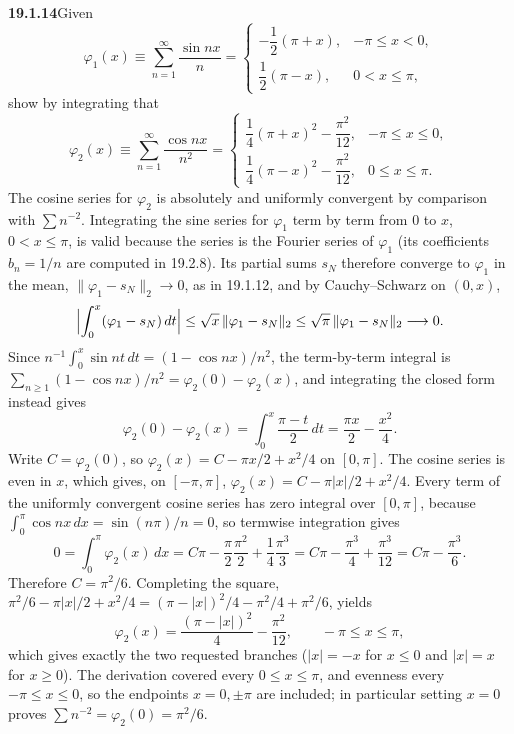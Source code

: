 \par\bigskip
\noindent\textbf{19.1.14}\quad Given
\[
\varphi_{1}(x)\equiv\sum_{n=1}^{\infty}\frac{\sin nx}{n}
=\begin{cases}
-\dfrac{1}{2}(\pi+x), & -\pi\le x<0,\\[10pt]
\dfrac{1}{2}(\pi-x), & 0<x\le\pi,
\end{cases}
\]
show by integrating that
\[
\varphi_{2}(x)\equiv\sum_{n=1}^{\infty}\frac{\cos nx}{n^{2}}
=\begin{cases}
\dfrac{1}{4}(\pi+x)^{2}-\dfrac{\pi^{2}}{12}, & -\pi\le x\le0,\\[12pt]
\dfrac{1}{4}(\pi-x)^{2}-\dfrac{\pi^{2}}{12}, & 0\le x\le\pi.
\end{cases}
\]
\solution
The cosine series for $\varphi_2$ is absolutely and uniformly convergent
by comparison with $\sum n^{-2}$.
Integrating the sine series for $\varphi_1$ term by term from $0$ to $x$,
$0<x\le\pi$, is valid because the series is the Fourier series of
$\varphi_1$ (its coefficients $b_n=1/n$ are computed in 19.2.8). Its
partial sums $s_N$ therefore converge to $\varphi_1$ in the mean,
$\|\varphi_1-s_N\|_2\to0$, as in 19.1.12, and by Cauchy--Schwarz on
$(0,x)$,
\[
\Bigl|\int_0^x(\varphi_1-s_N)\,dt\Bigr|\le\sqrt{x}\,\|\varphi_1-s_N\|_2
\le\sqrt{\pi}\,\|\varphi_1-s_N\|_2\longrightarrow0.
\]
Since $n^{-1}\int_0^x\sin nt\,dt=(1-\cos nx)/n^2$, the term-by-term
integral is $\sum_{n\ge1}(1-\cos nx)/n^2=\varphi_2(0)-\varphi_2(x)$, and
integrating the closed form instead gives
\[
\varphi_2(0)-\varphi_2(x)
=\int_0^x\frac{\pi-t}{2}\,dt
=\frac{\pi x}{2}-\frac{x^2}{4}.
\]
Write $C=\varphi_2(0)$, so $\varphi_2(x)=C-\pi x/2+x^2/4$ on $[0,\pi]$.
The cosine series is even in $x$, which gives, on $[-\pi,\pi]$,
$\varphi_2(x)=C-\pi|x|/2+x^2/4$.
Every term of the uniformly convergent cosine series has zero integral
over $[0,\pi]$, because $\int_0^\pi\cos nx\,dx=\sin(n\pi)/n=0$, so
termwise integration gives
\[
0=\int_0^\pi\varphi_2(x)\,dx
=C\pi-\frac\pi2\frac{\pi^2}{2}+\frac14\frac{\pi^3}{3}
=C\pi-\frac{\pi^3}{4}+\frac{\pi^3}{12}
=C\pi-\frac{\pi^3}{6}.
\]
Therefore $C=\pi^2/6$. Completing the square,
$\pi^2/6-\pi|x|/2+x^2/4=(\pi-|x|)^2/4-\pi^2/4+\pi^2/6$, yields
\[
\boxed{\varphi_2(x)=\frac{(\pi-|x|)^2}{4}-\frac{\pi^2}{12},
\qquad -\pi\le x\le\pi,}
\]
which gives exactly the two requested branches ($|x|=-x$ for $x\le0$ and
$|x|=x$ for $x\ge0$). The derivation covered every $0\le x\le\pi$, and
evenness every $-\pi\le x\le0$, so the endpoints $x=0,\pm\pi$ are
included; in particular setting $x=0$ proves
$\sum n^{-2}=\varphi_2(0)=\pi^2/6$.

